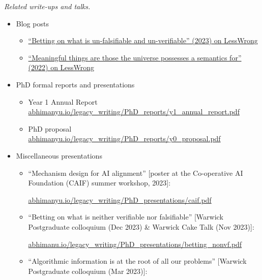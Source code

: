\documentclass{article}
\newenvironment{relatedwork}
   {
     \begin{mdframed}[
       leftmargin=1cm,
       rightmargin=0cm,
       innerleftmargin=10pt,
       innerrightmargin=0pt,
       innertopmargin=0.5em,
       innerbottommargin=0.5em,
       linewidth=1pt,
       linecolor=gray,
       topline=false,
       bottomline=false,
       rightline=false
     ]
     \footnotesize
   }
   {
     \end{mdframed}
   }
\begin{document}
\begin{relatedwork}
    \emph{Related write-ups and talks.}
    \begin{itemize}[label=—]
        \item Blog posts
              \begin{itemize}
                  \item \href{https://www.lesswrong.com/posts/id84oe3LxdzoqinKA/betting-on-what-is-un-falsifiable-and-un-verifiable}{``Betting on what is un-falsifiable and un-verifiable'' (2023) on LessWrong}
                  \item \href{https://www.lesswrong.com/posts/xqxXrAohXSD3akYCg/meaningful-things-are-those-the-universe-possesses-a}{``Meaningful things are those the universe possesses a semantics for'' (2022) on LessWrong}
              \end{itemize}
        \item PhD formal reports and presentations
              \begin{itemize}
                  \item Year 1 Annual Report \href{https://abhimanyu.io/legacy_writing/PhD_reports/y1_annual_report.pdf}{abhimanyu.io/legacy\_writing/PhD\_reports/y1\_annual\_report.pdf}
                  \item PhD proposal \href{https://abhimanyu.io/legacy_writing/PhD_reports/y0_proposal.pdf}{abhimanyu.io/legacy\_writing/PhD\_reports/y0\_proposal.pdf}
              \end{itemize}
        \item Miscellaneous presentations
              \begin{itemize}
                  \item ``Mechanism design for AI alignment'' [poster at the Co-operative AI Foundation (CAIF) summer workshop, 2023]:

                        \href{https://abhimanyu.io/legacy_writing/PhD_presentations/caif.pdf}{abhimanyu.io/legacy\_writing/PhD\_presentations/caif.pdf}

                  \item ``Betting on what is neither verifiable nor falsifiable'' [Warwick Postgraduate colloquium (Dec 2023) \& Warwick Cake Talk (Nov 2023)]:

                        \href{https://abhimanyu.io/legacy_writing/PhD_presentations/betting_nonvf.pdf}{abhimanu.io/legacy\_writing/PhD\_presentations/betting\_nonvf.pdf}

                  \item ``Algorithmic information is at the root of all our problems'' [Warwick Postgraduate colloquium (Mar 2023)]:


\end{itemize}
\end{itemize}
\end{relatedwork}
\end{document}
